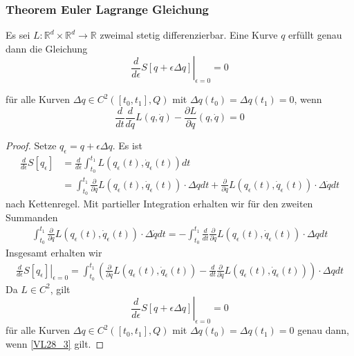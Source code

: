 \documentclass[]{article}
\begin{document}
\subsubsection*{Theorem Euler Lagrange Gleichung}
Es sei $L : \mathbb{R}^d \times \mathbb{R}^d \to \mathbb{R}$ zweimal stetig differenzierbar. Eine Kurve $q$ erfüllt genau dann die Gleichung 
\begin{equation*}
	\left. \frac{d}{d\epsilon} S[q + \epsilon \Delta q] \right\vert_{\epsilon=0} = 0 
\end{equation*}

für alle Kurven $\Delta q \in C^2 \left( [t_0, t_1], Q \right)$ mit $\Delta q(t_0) = \Delta q(t_1) = 0$, wenn
\begin{equation}
	\frac{d}{dt} \frac{d}{d\dot{q}} L(q, \dot{q}) - \frac{\partial L}{\partial q} (q, \dot{q}) = 0 \label{VL28_3}
\end{equation}
\begin{proof}
	Setze $q_\epsilon = q + \epsilon \Delta q$. Es ist
	\begin{align*}
		\frac{d}{d \epsilon} S[q_\epsilon ]
		&= \frac{d}{d \epsilon} \int_{t_0}^{t_1} L (q_\epsilon(t), \dot{q}_\epsilon(t) ) dt \\
		&= \int_{t_0}^{t_1} \frac{\partial}{\partial q} L (q_\epsilon(t), \dot{q}_\epsilon(t) ) \cdot \Delta q dt + \frac{\partial}{\partial \dot{q}} L (q_\epsilon(t), \dot{q}_\epsilon(t) ) \cdot \Delta \dot{q} dt
	\end{align*}
	nach Kettenregel. Mit partieller Integration erhalten wir für den zweiten Summanden
	\begin{align*}
		\int_{t_0}^{t_1} \frac{\partial}{\partial \dot{q}} L (q_\epsilon(t), \dot{q}_\epsilon(t) ) \cdot \Delta \dot{q} dt 
		=
		-\int_{t_0}^{t_1} \frac{d}{dt}\frac{\partial}{\partial \dot{q}} L (q_\epsilon(t), \dot{q}_\epsilon(t) ) \cdot \Delta q dt
	\end{align*}
	 Insgesamt erhalten wir
	\begin{align*}
		\left. \frac{d}{d \epsilon} S[q_\epsilon ] \right\vert_{\epsilon=0}
		= 
		\int_{t_0}^{t_1} \left( \frac{\partial}{\partial q} L (q_\epsilon(t), \dot{q}_\epsilon(t) )  -\frac{d}{dt}\frac{\partial}{\partial \dot{q}} L (q_\epsilon(t), \dot{q}_\epsilon(t) ) \right) \cdot \Delta q dt
	\end{align*}
	Da $L \in C^2$, gilt
	\begin{equation*}
		\left. \frac{d}{d \epsilon} S [q + \epsilon \Delta q] \right\vert_{\epsilon = 0} = 0
	\end{equation*}
	für alle Kurven $\Delta q \in C^2([t_0, t_1], Q)$ mit $\Delta q(t_0)= \Delta q(t_1) = 0$ genau dann, wenn \eqref{VL28_3} gilt.
\end{proof}
\end{document}
